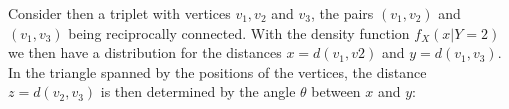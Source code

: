 \begin{figure}[H]
  \centering
\end{figure}

Consider then a triplet with vertices $v_1, v_2$ and $v_3$, the pairs
$(v_1,v_2)$ and $(v_1, v_3)$ being reciprocally connected. With the
density function $f_X(x|Y=2)$ we then have a distribution for the
distances $x = d(v_1, v2)$ and $y = d(v_1,v_3)$. In the triangle
spanned by the positions of the vertices, the distance $z=d(v_2,v_3)$
is then determined by the angle $\theta$ between $x$ and $y$:


